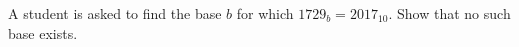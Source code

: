 A student is asked to find the base $b$ for which $1729_b=2017_{10}$. Show that no such base exists.
